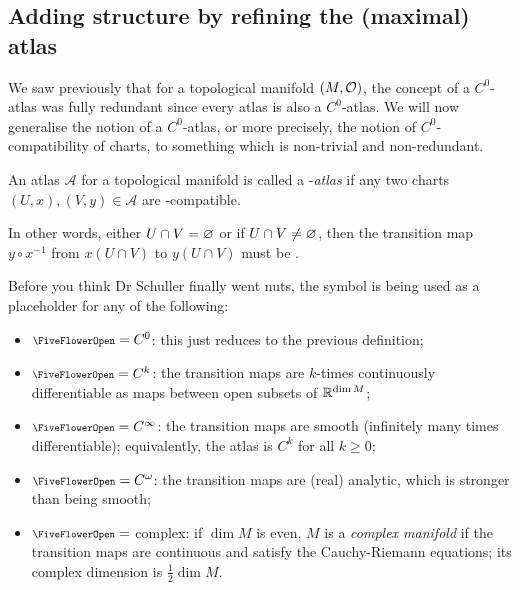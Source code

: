 
\subsection{Adding structure by refining the (maximal) atlas}

We saw previously that for a topological manifold $(M,\mathcal{O})$, the concept of a $C^0$-atlas was fully redundant since every atlas is also a $C^0$-atlas. We will now generalise the notion of a $C^0$-atlas, or more precisely, the notion of $C^0$-compatibility of charts, to something which is non-trivial and non-redundant.

\begin{definition}
An atlas $\mathscr{A}$ for a topological manifold is called a {\scalebox{0.75}\FiveFlowerOpen}-\emph{atlas} if any two charts $(U,x), (V,y) \in \mathscr{A}$ are {\scalebox{0.75}\FiveFlowerOpen}-compatible.
\end{definition}

In other words, either $U\cap V = \varnothing$ or if $U\cap V \neq \varnothing$, then the transition map $y\circ x^{-1}$ from $x(U\cap V)$ to $y(U\cap V)$ must be {\scalebox{0.75}\FiveFlowerOpen}.
\bse
{}
\ese
Before you think Dr Schuller finally went nuts, the symbol {\scalebox{0.75}\FiveFlowerOpen} is being used as a placeholder for any of the following:
\begin{itemize}
\item ${\scalebox{0.75}\FiveFlowerOpen} = C^0$: this just reduces to the previous definition;
\item ${\scalebox{0.75}\FiveFlowerOpen} = C^k$: the transition maps are $k$-times continuously differentiable as maps between open subsets of $\mathbb{R}^{\dim M}$;
\item ${\scalebox{0.75}\FiveFlowerOpen} = C^\infty$: the transition maps are smooth (infinitely many times differentiable); equivalently, the atlas is $C^k$ for all $k\geq 0$;
\item ${\scalebox{0.75}\FiveFlowerOpen} = C^\omega$: the transition maps are (real) analytic, which is stronger than being smooth;
\item ${\scalebox{0.75}\FiveFlowerOpen} =$ complex: if $\dim M$ is even, $M$ is a \emph{complex manifold} if the transition maps are continuous and satisfy the Cauchy-Riemann equations; its complex dimension is $\tfrac{1}{2}\dim M$.
\end{itemize}

